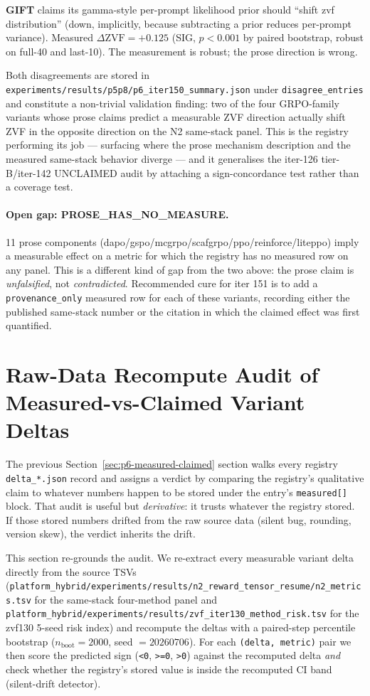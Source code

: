 \documentclass{article}
\providecommand{\secref}[1]{Section~\ref{#1}}
\begin{document}
\textbf{GIFT} claims its gamma-style per-prompt likelihood prior should
``shift zvf distribution'' (down, implicitly, because subtracting a
prior reduces per-prompt variance). Measured $\Delta \text{ZVF} = +0.125$
(SIG, $p < 0.001$ by paired bootstrap, robust on full-40 and last-10).
The measurement is robust; the prose direction is wrong.

Both disagreements are stored in
\texttt{experiments/results/p5p8/p6\_iter150\_summary.json} under
\texttt{disagree\_entries} and constitute a non-trivial validation
finding: two of the four GRPO-family variants whose prose claims
predict a measurable ZVF direction actually shift ZVF in the opposite
direction on the N2 same-stack panel. This is the registry performing
its job --- surfacing where the prose mechanism description and the
measured same-stack behavior diverge --- and it generalises the
iter-126 tier-B/iter-142 UNCLAIMED audit by attaching a sign-concordance
test rather than a coverage test.

\paragraph{Open gap: PROSE\_HAS\_NO\_MEASURE.}
11 prose components (dapo/gspo/mcgrpo/scafgrpo/ppo/reinforce/liteppo)
imply a measurable effect on a metric for which the registry has no
measured row on any panel. This is a different kind of gap from the two
above: the prose claim is \emph{unfalsified}, not \emph{contradicted}.
Recommended cure for iter 151 is to add a \texttt{provenance\_only}
measured row for each of these variants, recording either the published
same-stack number or the citation in which the claimed effect was first
quantified. \section{Raw-Data Recompute Audit of Measured-vs-Claimed Variant Deltas}
\label{sec:p6-iter190-raw-recompute}

The previous \secref{sec:p6-measured-claimed} section walks every registry
\texttt{delta\_*.json} record and assigns a verdict by comparing the
registry's qualitative claim to whatever numbers happen to be stored under
the entry's \texttt{measured[]} block. That audit is useful but
\emph{derivative}: it trusts whatever the registry stored. If those stored
numbers drifted from the raw source data (silent bug, rounding, version
skew), the verdict inherits the drift.

This section re-grounds the audit. We re-extract every measurable
variant delta directly from the source TSVs
(\texttt{platform_hybrid/experiments/results/n2\_reward\_tensor\_resume/n2\_metrics.tsv}
for the same-stack four-method panel and
\texttt{platform_hybrid/experiments/results/zvf\_iter130\_method\_risk.tsv} for the
zvf130 5-seed risk index) and recompute the deltas with a paired-step
percentile bootstrap ($n_{\text{boot}}{=}2000$, seed $=20260706$). For
each \texttt{(delta, metric)} pair we then score the predicted sign
(\texttt{<0}, \texttt{>=0}, \texttt{>0}) against the recomputed delta
\emph{and} check whether the registry's stored value is inside the
recomputed CI band (silent-drift detector).
\end{document}

